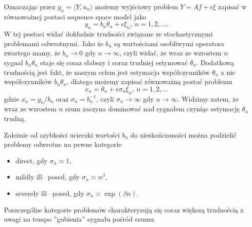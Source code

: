 \documentclass[12pt]{article}
\begin{document}
Oznaczając przez $y_n=\langle Y,u_n\rangle$ możemy wyjściowy problem $Y=Af+\epsilon\xi$ zapisać w równoważnej postaci sequence space model jako
\begin{displaymath}
y_n=b_n\theta_n+\epsilon\xi_n,\ n=1,2,\dots.
\end{displaymath}
W tej postaci widać dokładnie trudności związane ze stochastycznymi problemami odwrotnymi. Jako że $b_n$ są wartościami osobliwymi operatora zwartego mamy, że $b_n\to 0$ gdy $n\to \infty$, czyli widać, że wraz ze wzrostem $n$ sygnał $b_n\theta_n$ staje się coraz słabszy i coraz trudniej estymować $\theta_n$. Dodatkową trudnością jest fakt, że naszym celem jest estymacja współczynników $\theta_n$ a nie współczynników $b_n\theta_n$, dlatego możemy zapisać równoważną postać problemu
\begin{displaymath}
x_n=\theta_n+\epsilon\sigma_n\xi_n,\ n=1,2,\dots
\end{displaymath}
gdzie $x_n=y_n/b_n$ oraz $\sigma_n=b_n^{-1}$, czyli $\sigma_n\to \infty$ gdy $n\to \infty$. Widzimy zatem, że wraz ze wzrostem $n$ szum zaczyna dominować nad sygnałem czyniąc estymację $\theta_n$ trudną.

Zależnie od szybkości ucieczki wartości $b_n$ do nieskończoności można podzielić problemy odwrotne na pewne kategorie
\begin{itemize}
\item direct, gdy $\sigma_n\asymp 1$,
\item mildly ill-- posed, gdy $\sigma_n\asymp n^{\beta}$,
\item severely ill-- posed, gdy $\sigma_n\asymp \exp{(\beta n)}$.
\end{itemize}
Poszczególne kategorie problemów charakteryzują się coraz większą trudnością z uwagi na tempo ''gubienia'' sygnału pośród szumu.
\end{document}
